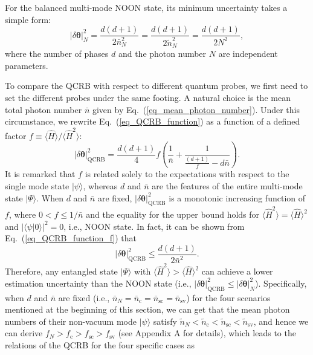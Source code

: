 \documentclass[aps,pra,reprint,showpacs,groupedaddress]{revtex4-1}
\begin{document}
For the balanced multi-mode NOON state, its minimum uncertainty takes a simple form:
\begin{equation}
    |\delta\boldsymbol{\theta}|_{N}^2
    =
    \frac{d(d+1)}{2\bar{n}_N^{2}}
    =
    \frac{d(d+1)}{2\tilde{n}_N^{2}}
    =
    \frac{d(d+1)}{2N^{2}},
    \label{eq_QCRB_NOON}
\end{equation}
where the number of phases $d$ and the photon number $N$ are independent parameters.




To compare the QCRB with respect to different quantum probes, we first need to set the different probes under the same footing.  A natural choice is the mean total photon number $\bar{n}$ given by Eq.~(\ref{eq_mean_photon_number}). Under this circumstance, we rewrite Eq.~(\ref{eq_QCRB_function}) as a function of a defined factor $f \equiv \langle\hat{H}\rangle / \langle \hat{H}^2 \rangle$:
\begin{equation}
    |\delta\boldsymbol{\theta}|_{\text{QCRB}}^2
    =
    \frac{d(d+1)}{4} f
    \left(\frac{1}{\bar{n}} + \frac{1}{ \frac{(d+1)}{f} - d \bar{n} }\right).
    \label{eq_QCRB_function_f}
\end{equation}
It is remarked that $f$ is related solely to the expectations with respect to the single mode state $|\psi\rangle$, whereas $d$ and $\bar{n}$ are the features of the entire multi-mode state $|\Psi\rangle$.
When $d$ and $\bar{n}$ are fixed, $|\delta\boldsymbol{\theta}|_{\text{QCRB}}^2$ is a monotonic increasing function of $f$, where $0 < f \leq 1/\bar{n}$ and the equality for the upper bound holds for $\langle \hat{H}^2 \rangle = \langle \hat{H}\rangle^2$ and $|\langle \psi|0\rangle|^2 = 0$, i.e., NOON state.
In fact, it can be shown from Eq.~(\ref{eq_QCRB_function_f}) that
\begin{equation}
    |\delta\boldsymbol{\theta}|_{\text{QCRB}}^2 \le \frac{d(d+1)}{2\bar{n}^2}
    \label{eq_QCRB_ineq}.
\end{equation}
Therefore, any entangled state $|\Psi\rangle$ with $\langle \hat{H}^2 \rangle > \langle \hat{H}\rangle^2$
can achieve a lower estimation uncertainty than the NOON state (i.e., $|\delta\boldsymbol{\theta}|_{\text{QCRB}}^2 \leq |\delta\boldsymbol{\theta}|_{N}^2$). Specifically, when $d$ and $\bar{n}$ are fixed (i.e., $\bar{n}_N = \bar{n}_\text{c} = \bar{n}_\text{sc} = \bar{n}_\text{sv}$) for the four scenarios mentioned at the beginning of this section, we can get that the mean photon numbers of their non-vacuum mode $|\psi\rangle$ satisfy $\tilde{n}_N < \tilde{n}_{\text{c}} < \tilde{n}_{\text{sc}} < \tilde{n}_{\text{sv}}$, and hence we can derive $f_N > f_{\text{c}} > f_{\text{sc}} > f_{\text{sv}}$ (see Appendix A for details), which leads to the relations of the QCRB for the four specific cases as
\end{document}
